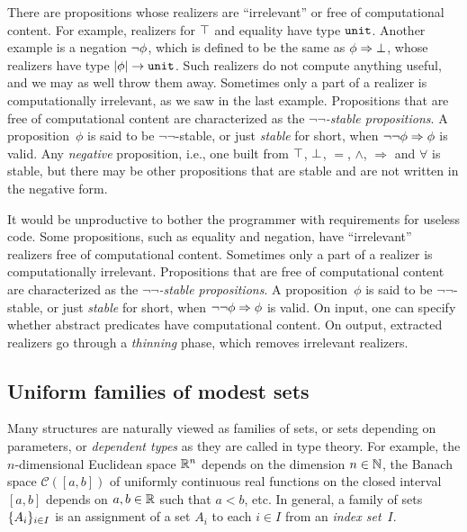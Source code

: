 \iflong
There are propositions whose realizers are ``irrelevant'' or free of
computational content. For example, realizers for $\top$ and
equality have type $\mathtt{unit}$. Another example is a negation
$\lnot \phi$, which is defined to be the same as
$\phi\Rightarrow \bot$, whose realizers have type
$|\phi| \to \mathtt{unit}$. Such realizers do not compute
anything useful, and we may as well throw them away. Sometimes only a
part of a realizer is computationally irrelevant, as we saw in the
last example. Propositions that are free of computational content
are characterized as the \emph{$\lnot\lnot$-stable propositions}. A
proposition~$\phi$ is said to be $\lnot\lnot$-stable, or just
\emph{stable} for short, when $\lnot \lnot \phi\Rightarrow \phi$ is
valid. Any \emph{negative} proposition, i.e., one built from $\top$,
$\bot$, $=$, $\land$, $\Rightarrow$ and $\forall$ is stable, but
there may be other propositions that are stable and are not written
in the negative form.

It would be unproductive to bother the programmer with requirements
for useless code.
%
\else
%
Some propositions, such as equality and negation, have ``irrelevant'' realizers
free of computational content. Sometimes only a
part of a realizer is computationally irrelevant. 
Propositions that are free of computational content are
characterized as the \emph{$\lnot\lnot$-stable propositions}. A
proposition~$\phi$ is said to be $\lnot\lnot$-stable, or just
\emph{stable} for short, when $\lnot \lnot \phi\Rightarrow \phi$ is
valid.
%
\fi
%
On input, one can specify whether abstract predicates
have computational content. On output, extracted realizers
go through a \emph{thinning} phase, which removes
irrelevant realizers.


\iflong
\subsection{Uniform families of modest sets}
\fi %
\label{sec:uniform-families}

Many structures are naturally viewed as families of sets, or sets
depending on parameters, or \emph{dependent types} as they are called
in type theory. For example, the $n$-dimensional Euclidean space
$\mathbb{R}^n$ depends on the dimension $n \in \mathbb{N}$, the Banach space
$\mathcal{C}([a,b])$ of uniformly continuous real functions on the
closed interval $[a,b]$ depends on $a, b \in \mathbb{R}$ such that $a < b$,
etc. In general, a family of sets $\{A_i\}_{i \in I}$ is an
assignment of a set $A_i$ to each $i \in I$ from an \emph{index
  set}~$I$.

